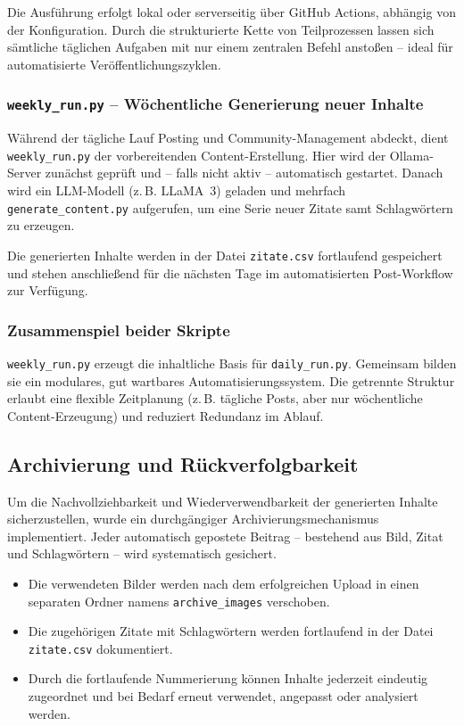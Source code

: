 \documentclass[a4paper,12pt]{article}
\begin{document}
Die Ausführung erfolgt lokal oder serverseitig über GitHub Actions, abhängig von der Konfiguration. Durch die strukturierte Kette von Teilprozessen lassen sich sämtliche täglichen Aufgaben mit nur einem zentralen Befehl anstoßen – ideal für automatisierte Veröffentlichungszyklen.

\subsubsection*{\texttt{weekly\_run.py} – Wöchentliche Generierung neuer Inhalte}

Während der tägliche Lauf Posting und Community-Management abdeckt, dient \texttt{weekly\_run.py} der vorbereitenden Content-Erstellung. Hier wird der Ollama-Server zunächst geprüft und – falls nicht aktiv – automatisch gestartet. Danach wird ein LLM-Modell (z.\,B. LLaMA~3) geladen und mehrfach \texttt{generate\_content.py} aufgerufen, um eine Serie neuer Zitate samt Schlagwörtern zu erzeugen.

Die generierten Inhalte werden in der Datei \texttt{zitate.csv} fortlaufend gespeichert und stehen anschließend für die nächsten Tage im automatisierten Post-Workflow zur Verfügung.

\subsubsection*{Zusammenspiel beider Skripte}

\texttt{weekly\_run.py} erzeugt die inhaltliche Basis für \texttt{daily\_run.py}. Gemeinsam bilden sie ein modulares, gut wartbares Automatisierungssystem. Die getrennte Struktur erlaubt eine flexible Zeitplanung (z.\,B. tägliche Posts, aber nur wöchentliche Content-Erzeugung) und reduziert Redundanz im Ablauf.
\subsection{Archivierung und Rückverfolgbarkeit}

Um die Nachvollziehbarkeit und Wiederverwendbarkeit der generierten Inhalte sicherzustellen, wurde ein durchgängiger Archivierungsmechanismus implementiert. Jeder automatisch gepostete Beitrag – bestehend aus Bild, Zitat und Schlagwörtern – wird systematisch gesichert.

\begin{itemize}
    \item Die verwendeten Bilder werden nach dem erfolgreichen Upload in einen separaten Ordner namens \texttt{archive\_images} verschoben.
    \item Die zugehörigen Zitate mit Schlagwörtern werden fortlaufend in der Datei \texttt{zitate.csv} dokumentiert.
    \item Durch die fortlaufende Nummerierung können Inhalte jederzeit eindeutig zugeordnet und bei Bedarf erneut verwendet, angepasst oder analysiert werden.
\end{itemize}
\end{document}
